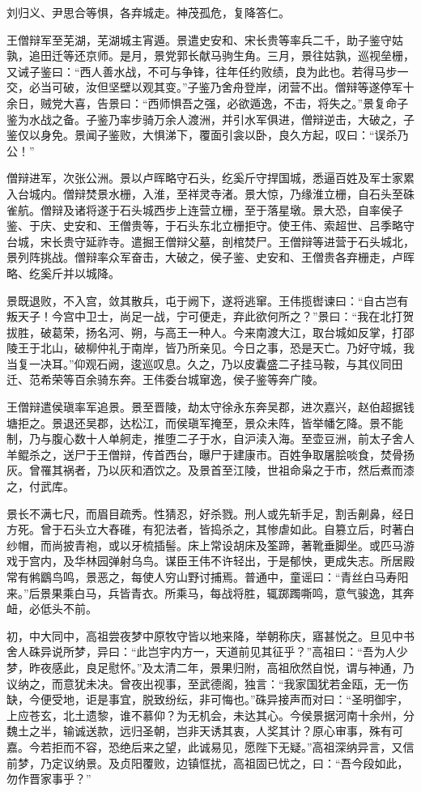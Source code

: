 \documentclass[12pt,UTF8]{ctexbook}
\begin{document}
刘归义、尹思合等惧，各弃城走。神茂孤危，复降答仁。

王僧辩军至芜湖，芜湖城主宵遁。景遣史安和、宋长贵等率兵二千，助子鉴守姑孰，追田迁等还京师。是月，景党郭长献马驹生角。三月，景往姑孰，巡视垒栅，又诫子鉴曰：“西人善水战，不可与争锋，往年任约败绩，良为此也。若得马步一交，必当可破，汝但坚壁以观其变。”子鉴乃舍舟登岸，闭营不出。僧辩等遂停军十余日，贼党大喜，告景曰：“西师惧吾之强，必欲遁逸，不击，将失之。”景复命子鉴为水战之备。子鉴乃率步骑万余人渡洲，并引水军俱进，僧辩逆击，大破之，子鉴仅以身免。景闻子鉴败，大惧涕下，覆面引衾以卧，良久方起，叹曰：“误杀乃公！”

僧辩进军，次张公洲。景以卢晖略守石头，纥奚斤守捍国城，悉逼百姓及军士家累入台城内。僧辩焚景水栅，入淮，至祥灵寺渚。景大惊，乃缘淮立栅，自石头至硃雀航。僧辩及诸将遂于石头城西步上连营立栅，至于落星墩。景大恐，自率侯子鉴、于庆、史安和、王僧贵等，于石头东北立栅拒守。使王伟、索超世、吕季略守台城，宋长贵守延祚寺。遣掘王僧辩父墓，剖棺焚尸。王僧辩等进营于石头城北，景列阵挑战。僧辩率众军奋击，大破之，侯子鉴、史安和、王僧贵各弃栅走，卢晖略、纥奚斤并以城降。

景既退败，不入宫，敛其散兵，屯于阙下，遂将逃窜。王伟揽辔谏曰：“自古岂有叛天子！今宫中卫士，尚足一战，宁可便走，弃此欲何所之？”景曰：“我在北打贺拔胜，破葛荣，扬名河、朔，与高王一种人。今来南渡大江，取台城如反掌，打邵陵王于北山，破柳仲礼于南岸，皆乃所亲见。今日之事，恐是天亡。乃好守城，我当复一决耳。”仰观石阙，逡巡叹息。久之，乃以皮囊盛二子挂马鞍，与其仪同田迁、范希荣等百余骑东奔。王伟委台城窜逸，侯子鉴等奔广陵。

王僧辩遣侯瑱率军追景。景至晋陵，劫太守徐永东奔吴郡，进次嘉兴，赵伯超据钱塘拒之。景退还吴郡，达松江，而侯瑱军掩至，景众未阵，皆举幡乞降。景不能制，乃与腹心数十人单舸走，推堕二子于水，自沪渎入海。至壶豆洲，前太子舍人羊鲲杀之，送尸于王僧辩，传首西台，曝尸于建康市。百姓争取屠脍啖食，焚骨扬灰。曾罹其祸者，乃以灰和酒饮之。及景首至江陵，世祖命枭之于市，然后煮而漆之，付武库。

景长不满七尺，而眉目疏秀。性猜忍，好杀戮。刑人或先斩手足，割舌劓鼻，经日方死。曾于石头立大舂碓，有犯法者，皆捣杀之，其惨虐如此。自篡立后，时著白纱帽，而尚披青袍，或以牙梳插髻。床上常设胡床及筌蹄，著靴垂脚坐。或匹马游戏于宫内，及华林园弹射乌鸟。谋臣王伟不许轻出，于是郁怏，更成失志。所居殿常有鸺鶹鸟鸣，景恶之，每使人穷山野讨捕焉。普通中，童谣曰：“青丝白马寿阳来。”后景果乘白马，兵皆青衣。所乘马，每战将胜，辄踯躅嘶鸣，意气骏逸，其奔衄，必低头不前。

初，中大同中，高祖尝夜梦中原牧守皆以地来降，举朝称庆，寤甚悦之。旦见中书舍人硃异说所梦，异曰：“此岂宇内方一，天道前见其征乎？”高祖曰：“吾为人少梦，昨夜感此，良足慰怀。”及太清二年，景果归附，高祖欣然自悦，谓与神通，乃议纳之，而意犹未决。曾夜出视事，至武德阁，独言：“我家国犹若金瓯，无一伤缺，今便受地，讵是事宜，脱致纷纭，非可悔也。”硃异接声而对曰：“圣明御宇，上应苍玄，北土遗黎，谁不慕仰？为无机会，未达其心。今侯景据河南十余州，分魏土之半，输诚送款，远归圣朝，岂非天诱其衷，人奖其计？原心审事，殊有可嘉。今若拒而不容，恐绝后来之望，此诚易见，愿陛下无疑。”高祖深纳异言，又信前梦，乃定议纳景。及贞阳覆败，边镇恇扰，高祖固已忧之，曰：“吾今段如此，勿作晋家事乎？”
\end{document}
